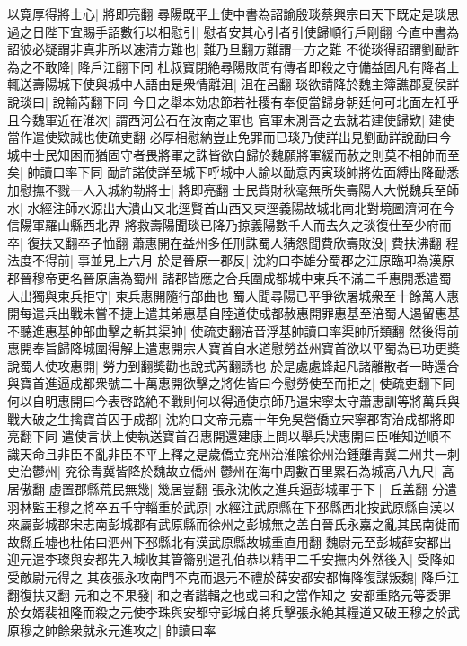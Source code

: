 以寛厚得將士心|{
	將即亮翻}
尋陽既平上使中書為詔諭殷琰蔡興宗曰天下既定是琰思過之日陛下宜賜手詔數行以相慰引|{
	慰者安其心引者引使歸順行戶剛翻}
今直中書為詔彼必疑謂非真非所以速清方難也|{
	難乃旦翻方難謂一方之難}
不從琰得詔謂劉勔詐為之不敢降|{
	降戶江翻下同}
杜叔寶閉絶尋陽敗問有傳者即殺之守備益固凡有降者上輒送壽陽城下使與城中人語由是衆情離沮|{
	沮在呂翻}
琰欲請降於魏主簿譙郡夏侯詳說琰曰|{
	說輸芮翻下同}
今日之舉本効忠節若社稷有奉便當歸身朝廷何可北面左衽乎且今魏軍近在淮次|{
	謂西河公石在汝南之軍也}
官軍未測吾之去就若建使歸欵|{
	建使當作遣使欵誠也使疏吏翻}
必厚相慰納豈止免罪而已琰乃使詳出見劉勔詳說勔曰今城中士民知困而猶固守者畏將軍之誅皆欲自歸於魏願將軍緩而赦之則莫不相帥而至矣|{
	帥讀曰率下同}
勔許諾使詳至城下呼城中人諭以勔意丙寅琰帥將佐面縛出降勔悉加慰撫不戮一人入城約勒將士|{
	將即亮翻}
士民貲財秋毫無所失壽陽人大悦魏兵至師水|{
	水經注師水源出大潰山又北逕賢首山西又東逕義陽故城北南北對境圖濟河在今信陽軍羅山縣西北界}
將救壽陽聞琰已降乃掠義陽數千人而去久之琰復仕至少府而卒|{
	復扶又翻卒子恤翻}
蕭惠開在益州多任刑誅蜀人猜怨聞費欣壽敗没|{
	費扶沸翻}
程法度不得前|{
	事並見上六月}
於是晉原一郡反|{
	沈約曰李雄分蜀郡之江原臨卭為漢原郡晉穆帝更名晉原唐為蜀州}
諸郡皆應之合兵圍成都城中東兵不滿二千惠開悉遣蜀人出獨與東兵拒守|{
	東兵惠開隨行部曲也}
蜀人聞尋陽已平爭欲屠城衆至十餘萬人惠開每遣兵出戰未嘗不捷上遣其弟惠基自陸道使成都赦惠開罪惠基至涪蜀人遏留惠基不聽進惠基帥部曲擊之斬其渠帥|{
	使疏吏翻涪音浮基帥讀曰率渠帥所類翻}
然後得前惠開奉旨歸降城圍得解上遣惠開宗人寶首自水道慰勞益州寶首欲以平蜀為已功更奬說蜀人使攻惠開|{
	勞力到翻奬勸也說式芮翻誘也}
於是處處蜂起凡諸離散者一時還合與寶首進逼成都衆號二十萬惠開欲擊之將佐皆曰今慰勞使至而拒之|{
	使疏吏翻下同}
何以自明惠開曰今表啓路絶不戰則何以得通使京師乃遣宋寧太守蕭惠訓等將萬兵與戰大破之生擒寶首囚于成都|{
	沈約曰文帝元嘉十年免吳營僑立宋寧郡寄治成都將即亮翻下同}
遣使言狀上使執送寶首召惠開還建康上問以舉兵狀惠開曰臣唯知逆順不識天命且非臣不亂非臣不平上釋之是歲僑立兖州治淮隂徐州治鍾離青冀二州共一刺史治鬱州|{
	兖徐青冀皆降於魏故立僑州}
鬱州在海中周數百里累石為城高八九尺|{
	高居傲翻}
虚置郡縣荒民無幾|{
	幾居豈翻}
張永沈攸之進兵逼彭城軍于下|{
	丘盖翻}
分遣羽林監王穆之將卒五千守輜重於武原|{
	水經注武原縣在下邳縣西北按武原縣自漢以來屬彭城郡宋志南彭城郡有武原縣而徐州之彭城無之盖自晉氏永嘉之亂其民南徙而故縣丘墟也杜佑曰泗州下邳縣北有漢武原縣故城重直用翻}
魏尉元至彭城薛安都出迎元遣李璨與安都先入城收其管籥别遣孔伯恭以精甲二千安撫内外然後入|{
	受降如受敵尉元得之}
其夜張永攻南門不克而退元不禮於薛安都安都悔降復謀叛魏|{
	降戶江翻復扶又翻}
元和之不果發|{
	和之者諧輯之也或曰和之當作知之}
安都重賂元等委罪於女婿裴祖隆而殺之元使李珠與安都守彭城自將兵擊張永絶其糧道又破王穆之於武原穆之帥餘衆就永元進攻之|{
	帥讀曰率}


